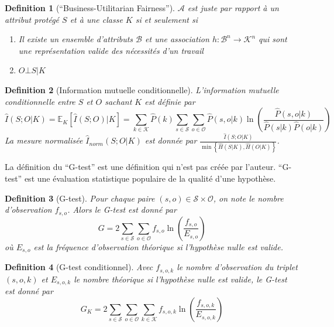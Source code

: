 \documentclass[draft]{article}
\newtheorem{myDef}{Definition}
\theoremstyle{definition}
\begin{document}
\begin{myDef}[``Business-Utilitarian Fairness'']
  \label{defBusiness}
  $\mathcal{A}$ est juste par rapport à un attribut protégé $S$ et à une classe $K$ si et seulement si
  \begin{enumerate}
  \item Il existe un ensemble d'attributs $\mathcal{B}$ et une association $h : \mathcal{B}^{n} \rightarrow \mathcal{K}^{n}$ qui sont une représentation valide des nécessités d'un travail
  \item $O \bot S | K$
  \end{enumerate}
\end{myDef}

\begin{myDef}[Information mutuelle conditionnelle]
  L'information mutuelle conditionnelle entre $S$ et $O$ sachant $K$ est définie par
  \[
  \hat{I}(S;O|K) = \mathbb{E}_{K}[\hat{I}(S;O)|K] = \sum_{k \in \mathcal{K}} \hat{P}(k) \sum_{s \in \mathcal{S}} \sum_{o \in \mathcal{O}} \hat{P}(s,o|k) \ln \left( \frac{\hat{P}(s,o|k)}{\hat{P}(s|k) \hat{P}(o|k)} \right)
  \]
  La mesure normalisée $\hat{I}_{norm}(S;O|K)$ est donnée par $\frac{\hat{I}(S;O|K)}{\min \left\{ \hat{H}(S|K), \hat{H}(O|K) \right\}}$.
\end{myDef}

La définition du ``G-test'' est une définition qui n'est pas créée par l'auteur. ``G-test'' est une évaluation statistique populaire de la qualité d'une hypothèse.
\begin{myDef}[G-test]
  Pour chaque paire $(s,o) \in \mathcal{S} \times \mathcal{O}$, on note le nombre d'observation $f_{s,o}$. Alors le G-test est donné par
  \[
  G = 2 \sum_{s \in \mathcal{S}} \sum_{o \in \mathcal{O}} f_{s,o} \ln \left( \frac{f_{s,o}}{E_{s,o}} \right)
  \]
  où $E_{s,o}$ est la fréquence d'observation théorique si l'hypothèse nulle est valide.
\end{myDef}

\begin{myDef}[G-test conditionnel]
  Avec $f_{s,o,k}$ le nombre d'observation du triplet $(s,o,k)$ et $E_{s,o,k}$ le nombre théorique si l'hypothèse nulle est valide, le G-test est donné par
  \[
  G_{K} = 2 \sum_{s \in \mathcal{S}} \sum_{o \in \mathcal{O}} \sum_{k \in \mathcal{K}} f_{s,o,k} \ln \left( \frac{f_{s,o,k}}{E_{s,o,k}} \right)
  \]
\end{myDef}


\end{document}
